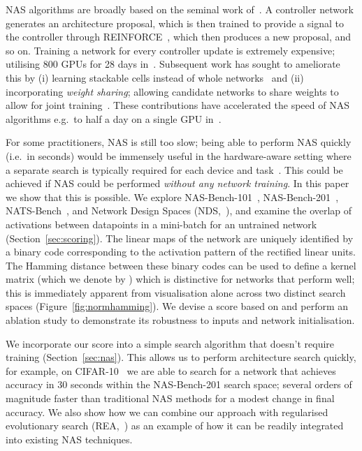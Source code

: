 \documentclass{article}
\newcommand{\maybebf}[0]{}
\begin{document}
NAS algorithms are broadly based on the seminal work of~\cite{zoph2017neural}. A controller network generates an architecture proposal, which is then trained to provide a signal to the controller through REINFORCE~\citep{williams1992simple}, which then produces a new proposal, and so on. Training a network for every controller update is extremely expensive; utilising 800 GPUs for 28 days in~\cite{zoph2017neural}. Subsequent work has sought to ameliorate this by (i) learning stackable cells instead of whole networks~\citep{zoph2018learning} and (ii) incorporating {\it weight sharing}; allowing candidate networks to share weights to allow for joint training~\citep{pham2018efficient}. These contributions have accelerated the speed of NAS algorithms e.g.\ to half a day on a single GPU in~\cite{pham2018efficient}.

For some practitioners, NAS is still too slow; being able to perform NAS quickly (i.e.\ in seconds) would be immensely useful in the hardware-aware setting where a separate search is typically required for each device and task~\citep{wu2019fbnet,tan2019mnasnet}. This could be achieved if NAS could be performed {\it without any network training}. In this paper {\maybebf we show that this is possible}. We explore NAS-Bench-101~\citep{ying2019bench}, NAS-Bench-201~\citep{Dong2020NAS-Bench-201}, NATS-Bench~\citep{dong2021nats}, and Network Design Spaces (NDS,~\citealp{radosavovic2019network}), and examine the overlap of activations between datapoints in a mini-batch for an {\maybebf untrained} network (Section~\ref{sec:scoring}). The linear maps of the network are uniquely identified by a binary code corresponding to the activation pattern of the rectified linear units. The Hamming distance between these binary codes can be used to define a kernel matrix (which we denote by ) which is distinctive for networks that perform well; this is immediately apparent from visualisation alone across two distinct search spaces (Figure~\ref{fig:normhamming}). We devise a score based on  and perform an ablation study to demonstrate its robustness to inputs and network initialisation.

We incorporate our score into a simple search algorithm that {\maybebf doesn't require training} (Section~\ref{sec:nas}). This allows us to perform architecture search quickly, for example, on CIFAR-10~\citep{krizhevsky2009learning} we are able to search for a network that achieves  accuracy in 30 seconds within the NAS-Bench-201 search space; several orders of magnitude faster than traditional NAS methods for a modest change in final accuracy. We also show how we can combine our approach with regularised evolutionary search (REA,~\citealp{pham2018efficient}) as an example of how it can be readily integrated into existing NAS techniques.
\end{document}
